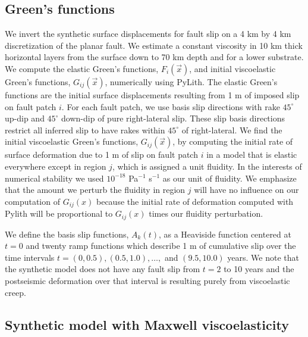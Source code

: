 \documentclass[extra,mreferee]{gji}
\begin{document}
\subsection{Green's functions}\label{GreensFunc}
We invert the synthetic surface displacements for fault slip on a 4 km
by 4 km discretization of the planar fault.  We estimate a constant
viscosity in 10 km thick horizontal layers from the surface down to 70
km depth and for a lower substrate. We compute the elastic Green's
functions, $F_i(\vec{x})$, and initial viscoelastic Green's functions,
$G_{ij}(\vec{x})$, numerically using PyLith.  The elastic Green's
functions are the initial surface displacements resulting from 1 m of
imposed slip on fault patch $i$.  For each fault patch, we use basis
slip directions with rake $45^\circ$ up-dip and $45^\circ$ down-dip of
pure right-lateral slip.  These slip basis directions restrict all
inferred slip to have rakes within $45^\circ$ of right-lateral. We
find the initial viscoelastic Green's functions, $G_{ij}(\vec{x})$, by
computing the initial rate of surface deformation due to 1 m of slip
on fault patch $i$ in a model that is elastic everywhere except in
region $j$, which is assigned a unit fluidity.  In the interests of
numerical stability we used $10^{-18}$ Pa$^{-1}$ s$^{-1}$ as our unit
of fluidity.  We emphasize that the amount we perturb the fluidity in
region $j$ will have no influence on our computation of $G_{ij}(x)$
because the initial rate of deformation computed with Pylith will be
proportional to $G_{ij}(x)$ times our fluidity perturbation.

We define the basis slip functions, $A_k(t)$, as a Heaviside function
centered at $t=0$ and twenty ramp functions which describe 1 m of
cumulative slip over the time intervals $t = (0,0.5), (0.5,1.0),
\dots,$ and $(9.5,10.0)$ years. We note that the synthetic model does
not have any fault slip from $t=2$ to 10 years and the postseismic
deformation over that interval is resulting purely from viscoelastic
creep.

\subsection{Synthetic model with Maxwell viscoelasticity}\label{MaxModel}
\end{document}
